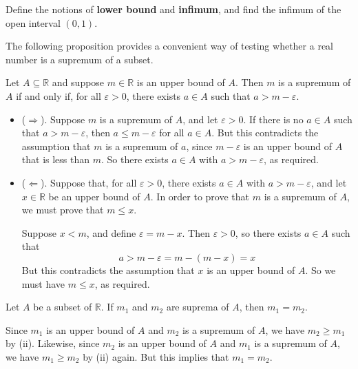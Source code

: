 \begin{exercise}
\label{exDefineLowerBoundInfimum}
Define the notions of \textbf{lower bound} and \textbf{infimum}, and find the infimum of the open interval $(0,1)$.
\end{exercise}

The following proposition provides a convenient way of testing whether a real number is a supremum of a subset.

\begin{proposition}
\label{propSupremumEpsilon}
Let $A \subseteq \mathbb{R}$ and suppose $m \in \mathbb{R}$ is an upper bound of $A$. Then $m$ is a supremum of $A$ if and only if, for all $\varepsilon > 0$, there exists $a \in A$ such that $a > m-\varepsilon$.
\end{proposition}

\begin{cproof}
\fixlistskip
\begin{itemize}
\item ($\Rightarrow$). Suppose $m$ is a supremum of $A$, and let $\varepsilon > 0$. If there is no $a \in A$ such that $a > m - \varepsilon$, then $a \le m-\varepsilon$ for all $a \in A$. But this contradicts the assumption that $m$ is a supremum of $a$, since $m-\varepsilon$ is an upper bound of $A$ that is less than $m$. So there exists $a \in A$ with $a > m - \varepsilon$, as required.

\item ($\Leftarrow$). Suppose that, for all $\varepsilon > 0$, there exists $a \in A$ with $a > m-\varepsilon$, and let $x \in \mathbb{R}$ be an upper bound of $A$. In order to prove that $m$ is a supremum of $A$, we must prove that $m \le x$.

Suppose $x < m$, and define $\varepsilon = m-x$. Then $\varepsilon > 0$, so there exists $a \in A$ such that
\[ a > m - \varepsilon = m - (m-x) = x \]
But this contradicts the assumption that $x$ is an upper bound of $A$. So we must have $m \le x$, as required.
\end{itemize}
\end{cproof}

\begin{theorem}
Let $A$ be a subset of $\mathbb{R}$. If $m_1$ and $m_2$ are suprema of $A$, then $m_1 = m_2$.
\end{theorem}

\begin{cproof}
Since $m_1$ is an upper bound of $A$ and $m_2$ is a supremum of $A$, we have $m_2 \ge m_1$ by (ii). Likewise, since $m_2$ is an upper bound of $A$ and $m_1$ is a supremum of $A$, we have $m_1 \ge m_2$ by (ii) again. But this implies that $m_1 = m_2$.
\end{cproof}

